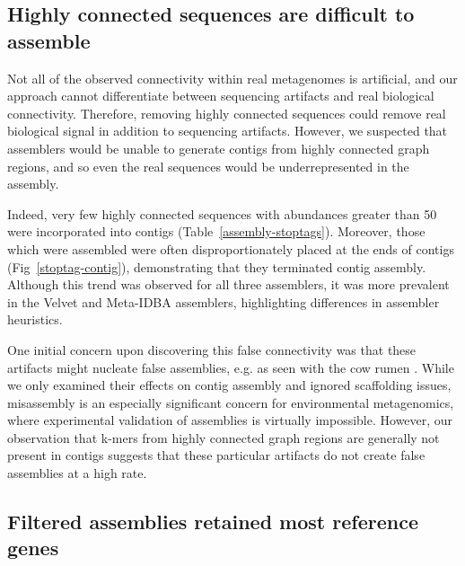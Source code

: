 \documentclass[10pt]{article}
\begin{document}
\subsection*{Highly connected sequences are difficult to assemble}

Not all of the observed connectivity within real metagenomes is
artificial, and our approach cannot differentiate between sequencing
artifacts and real biological connectivity.  Therefore, removing
highly connected sequences could remove real biological signal in
addition to sequencing artifacts.  However, we suspected that
assemblers would be unable to generate contigs from highly connected
graph regions, and so even the real sequences would be
underrepresented in the assembly.

Indeed, very few highly connected sequences with abundances greater
than 50 were incorporated into contigs (Table~\ref{assembly-stoptags}). Moreover, those
which were assembled were often disproportionately placed at the ends
of contigs (Fig~\ref{stoptag-contig}), demonstrating that they terminated contig
assembly.  Although this trend was observed for all three assemblers,
it was more prevalent in the Velvet and Meta-IDBA assemblers,
highlighting differences in assembler heuristics.

One initial concern upon discovering this false connectivity was that
these artifacts might nucleate false assemblies, e.g. as seen with the cow
rumen \cite{Hess:2011p686}.  While we only examined their effects on
contig assembly and ignored scaffolding issues, misassembly is an
especially significant concern for environmental metagenomics, where
experimental validation of assemblies is virtually impossible.
However, our observation that k-mers from highly connected graph
regions are generally not present in contigs suggests that these
particular artifacts do not create false assemblies at a high rate.

\subsection*{Filtered assemblies retained most reference genes}
\end{document}
